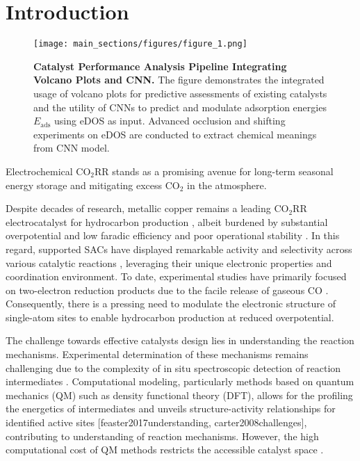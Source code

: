 

\section{Introduction}

\begin{figure}
    \centering
    \texttt{[image: main\_sections/figures/figure\_1.png]}
    \caption{\textbf{Catalyst Performance Analysis Pipeline Integrating Volcano Plots and CNN.}
    The figure demonstrates the integrated usage of volcano plots for predictive assessments of existing catalysts and the utility of CNNs to predict and modulate adsorption energies \(E_{\text{ads}}\) using eDOS as input.
    Advanced occlusion and shifting experiments on eDOS are conducted to extract chemical meanings from CNN model.}
    \label{main_fig1:pipeline}
\end{figure}

Electrochemical CO$_2$RR stands as a promising avenue for long-term seasonal energy storage \cite{dinh2018co2} and mitigating excess CO$_2$ in the atmosphere.

Despite decades of research, metallic copper remains a leading CO$_2$RR electrocatalyst for hydrocarbon production \cite{osella2023co2}, albeit burdened by substantial overpotential and low faradic efficiency and poor operational stability \cite{chen2019identifying, liu2021co2}.
In this regard, supported SACs have displayed remarkable activity and selectivity across various catalytic reactions \cite{wang2018heterogeneous, yang2018atomically}, leveraging their unique electronic properties and coordination environment.
To date, experimental studies have primarily focused on two-electron reduction products due to the facile release of gaseous CO \cite{cai2021insights, ju2017understanding, ren2019isolated}.
Consequently, there is a pressing need to modulate the electronic structure of single-atom sites to enable hydrocarbon production at reduced overpotential.

The challenge towards effective catalysts design lies in understanding the reaction mechanisms.
Experimental determination of these mechanisms remains challenging due to the complexity of in situ spectroscopic detection of reaction intermediates \cite{zhao2021revisiting}.
Computational modeling, particularly methods based on quantum mechanics (QM) such as density functional theory (DFT),
allows for the profiling the energetics of intermediates and unveils structure-activity relationships for identified active sites [feaster2017understanding, carter2008challenges], contributing to understanding of reaction mechanisms.
However, the high computational cost of QM methods restricts the accessible catalyst space \cite{jinnouchi2017predicting, cuenya2015nanocatalysis, goldsmith2018machine}.

